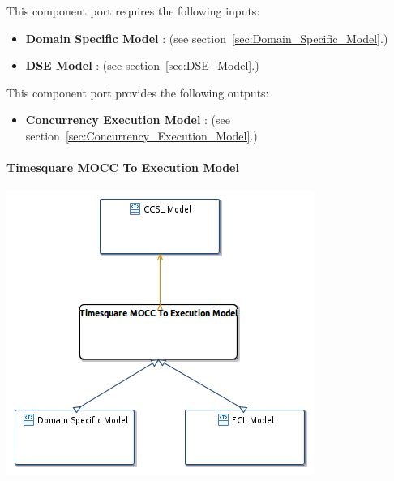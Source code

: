 \documentclass{gemoc} %
\begin{document}
This component port requires the following inputs:
\begin{itemize}
  \item \textbf{Domain Specific Model} :
(see section~\ref{sec:Domain_Specific_Model}.)
  \item \textbf{DSE Model} :
(see section~\ref{sec:DSE_Model}.)
\end{itemize}

This component port provides the following outputs:
\begin{itemize}
  \item \textbf{Concurrency Execution Model} :
(see section~\ref{sec:Concurrency_Execution_Model}.)
\end{itemize}

\paragraph{Timesquare MOCC To Execution Model}
\label{sec:Timesquare_MOCC_To_Execution_Model}


\begin{center}
\includegraphics*[trim=0.0cm 0.0cm 0cm 0.0cm, clip=true]{../images/generated/Generated_Timesquare_MOCC_To_Execution_Model.png}
\end{center}
\end{document}

